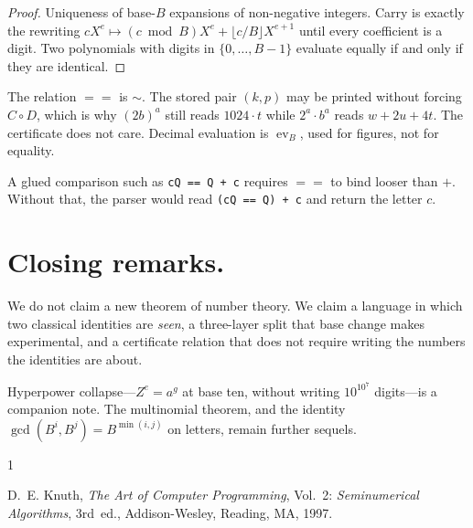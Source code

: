 \documentclass{article}
\DeclareMathOperator{\ev}{ev}
\newcommand{\eqc}{\mathrel{\mathtt{==}}}
\theoremstyle{plain}
\theoremstyle{definition}
\theoremstyle{remark}
\begin{document}
\begin{proof}
Uniqueness of base-\(B\) expansions of non-negative integers. Carry is
exactly the rewriting
\(c X^e \mapsto (c \bmod B) X^e + \lfloor c/B\rfloor X^{e+1}\)
until every coefficient is a digit. Two polynomials with digits in
\(\{0,\ldots,B-1\}\) evaluate equally if and only if they are identical.
\end{proof}

The relation \(\eqc\) is \(\sim\). The stored pair \((k,p)\) may be
printed without forcing \(C\circ D\), which is why \((2b)^a\) still reads
\(1024\cdot t\) while \(2^a \cdot b^a\) reads \(w+2u+4t\). The
certificate does not care. Decimal evaluation is \(\ev_B\), used for
figures, not for equality.

A glued comparison such as \texttt{cQ == Q + c} requires
\(\eqc\) to bind looser than \(+\). Without that, the parser would read
\texttt{(cQ == Q) + c} and return the letter \(c\).

\section{Closing remarks.}
\label{sec:close}

We do not claim a new theorem of number theory. We claim a language in
which two classical identities are \emph{seen}, a three-layer split that
base change makes experimental, and a certificate relation that does not
require writing the numbers the identities are about.

Hyperpower collapse---\(Z^e = a^g\) at base ten, without writing
\(10^{10^7}\) digits---is a companion note. The multinomial theorem, and
the identity \(\gcd(B^i,B^j)=B^{\min(i,j)}\) on letters, remain further
sequels.

\begin{thebibliography}{1}

D.~E. Knuth,
\textit{The Art of Computer Programming}, Vol.~2:
\textit{Seminumerical Algorithms}, 3rd~ed.,
Addison-Wesley, Reading, MA, 1997.

\end{thebibliography}
\end{document}
